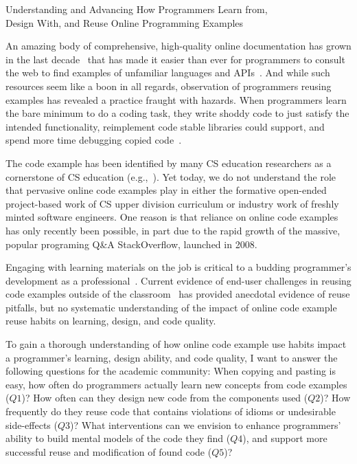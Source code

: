 \documentclass[12pt]{memoir}
\title{}
\author{Andrew Head}
\begin{document}
\begin{center}
Understanding and Advancing How Programmers Learn from,\\ Design With, and Reuse Online Programming Examples
\end{center}
\vspace{-1ex}




An amazing body of comprehensive, high-quality online documentation has grown in the last decade~\cite{parnin_crowd_2012,mamykina_design_2011} that has made it easier than ever for programmers to consult the web to find examples of unfamiliar languages and APIs~\cite{brandt_two_2009}.
And while such resources seem like a boon in all regards, observation of programmers reusing examples has revealed a practice fraught with hazards.
When programmers learn the bare minimum to do a coding task, they write shoddy code to just satisfy the intended functionality, reimplement code stable libraries could support, and spend more time debugging copied code~\cite{brandt_opportunistic_2008,brandt_two_2009}.

The code example has been identified by many CS education researchers as a cornerstone of CS education (e.g.,~\cite{lahtinen_study_2005}).
Yet today, we do not understand the role that pervasive online code examples play in either the formative open-ended project-based work of CS upper division curriculum or industry work of freshly minted software engineers.
One reason is that reliance on online code examples has only recently been possible, in part due to the rapid growth of the massive, popular programing Q\&A StackOverflow, launched in 2008.

Engaging with learning materials on the job is critical to a budding programmer's development as a professional~\cite{exter_exploring_2012}.
Current evidence of end-user challenges in reusing code examples outside of the classroom~\cite{brandt_two_2009} has provided anecdotal evidence of reuse pitfalls, but no systematic understanding of the impact of online code example reuse habits on learning, design, and code quality.
\fi

To gain a thorough understanding of how online code example use habits impact a programmer's learning, design ability, and code quality, I want to answer the following questions for the academic community:
When copying and pasting is easy, how often do programmers actually learn new concepts from code examples ($Q1$)?
How often can they design new code from the components used ($Q2$)?
How frequently do they reuse code that contains violations of idioms or undesirable side-effects ($Q3$)?
What interventions can we envision to enhance programmers' ability to build mental models of the code they find ($Q4$), and support more successful reuse and modification of found code ($Q5$)?
\end{document}
